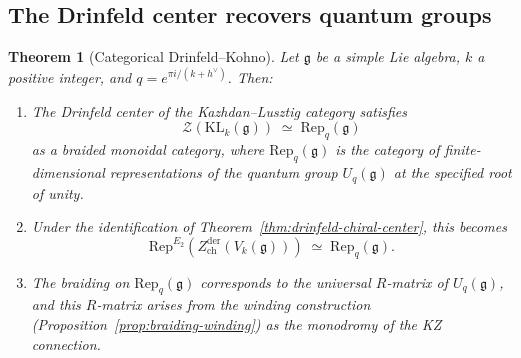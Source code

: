 \documentclass[11pt]{article}
\newtheorem{theorem}{Theorem}[section]
\theoremstyle{definition}
\theoremstyle{remark}
\newcommand{\Rep}{\mathrm{Rep}}
\newcommand{\Uq}{U_q}
\newcommand{\cZ}{\mathcal{Z}}
\newcommand{\frakg}{\mathfrak{g}}
\newcommand{\KL}{\mathrm{KL}}
\newcommand{\Zder}{Z^{\mathrm{der}}_{\mathrm{ch}}}
\begin{document}
\subsection{The Drinfeld center recovers quantum groups}

\begin{theorem}[Categorical Drinfeld--Kohno]
\label{thm:categorical-dk}
Let $\frakg$ be a simple Lie algebra, $k$ a positive integer, and $q = e^{\pi i / (k + h^\vee)}$. Then:
\begin{enumerate}[label=(\roman*)]
 \item The Drinfeld center of the Kazhdan--Lusztig category satisfies
 \begin{equation}
 \label{eq:center-kl}
 \cZ(\KL_k(\frakg)) \;\simeq\; \Rep_q(\frakg)
 \end{equation}
 as a braided monoidal category, where $\Rep_q(\frakg)$ is the category of finite-dimensional representations of the quantum group $\Uq(\frakg)$ at the specified root of unity.
 \item Under the identification of Theorem~\ref{thm:drinfeld-chiral-center}, this becomes
 \begin{equation}
 \label{eq:rep-e2-zder}
 \Rep^{E_2}(\Zder(V_k(\frakg))) \;\simeq\; \Rep_q(\frakg).
 \end{equation}
 \item The braiding on $\Rep_q(\frakg)$ corresponds to the universal $R$-matrix of $\Uq(\frakg)$, and this $R$-matrix arises from the winding construction (Proposition~\ref{prop:braiding-winding}) as the monodromy of the KZ connection.
\end{enumerate}
\end{theorem}
\end{document}
